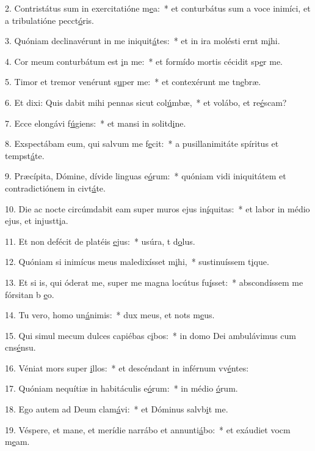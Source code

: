 2. Contristátus sum in exercitatióne m\uline{e}a:~* et conturbátus sum a voce inimíci, et a tribulatióne pecct\uline{ó}ris.\par 
3. Quóniam declinavérunt in me iniquit\uline{á}tes:~* et in ira molésti ernt m\uline{i}hi.\par 
4. Cor meum conturbátum est \uline{i}n me:~* et formído mortis cécidit sp\uline{e}r me.\par 
5. Timor et tremor venérunt s\uline{u}per me:~* et contexérunt me tn\uline{e}bræ.\par 
6. Et dixi: Quis dabit mihi pennas sicut col\uline{ú}mbæ,~* et volábo, et re\uline{é}scam?\par 
7. Ecce elongávi f\uline{ú}giens:~* et mansi in solitd\uline{i}ne.\par 
8. Exspectábam eum, qui salvum me f\uline{e}cit:~* a pusillanimitáte spíritus et tempst\uline{á}te.\par 
9. Præcípita, Dómine, dívide linguas e\uline{ó}rum:~* quóniam vidi iniquitátem et contradictiónem in civt\uline{á}te.\par 
10. Die ac nocte circúmdabit eam super muros ejus in\uline{í}quitas:~* et labor in médio ejus, et injustt\uline{i}a.\par 
11. Et non defécit de platéis \uline{e}jus:~* usúra, t d\uline{o}lus.\par 
12. Quóniam si inimícus meus maledixísset m\uline{i}hi,~* sustinuíssem t\uline{i}que.\par 
13. Et si is, qui óderat me, super me magna locútus fu\uline{í}sset:~* abscondíssem me fórsitan b \uline{e}o.\par 
14. Tu vero, homo un\uline{á}nimis:~* dux meus, et nots m\uline{e}us.\par 
15. Qui simul mecum dulces capiébas c\uline{i}bos:~* in domo Dei ambulávimus cum cns\uline{é}nsu.\par 
16. Véniat mors super \uline{i}llos:~* et descéndant in inférnum vv\uline{é}ntes:\par 
17. Quóniam nequítiæ in habitáculis e\uline{ó}rum:~* in médio \uline{ó}rum.\par 
18. Ego autem ad Deum clam\uline{á}vi:~* et Dóminus salvb\uline{i}t me.\par 
19. Véspere, et mane, et merídie narrábo et annunti\uline{á}bo:~* et exáudiet vocm m\uline{e}am.\par 
